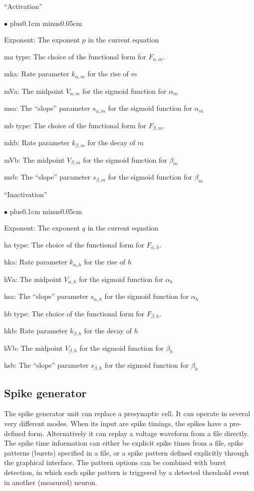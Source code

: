 \documentclass{article}
\newenvironment{myitem}{\begin{list}{$\bullet$}{\setlength{\leftmargin}{1.1em}
\itemsep0.1cm plus0.1cm minus0.05cm
\listparindent0cm
\addtolength{\labelsep}{0.5\labelsep}
\setlength{\labelwidth}{0.8em}
\setlength{\leftmargin}{\labelwidth}
\addtolength{\leftmargin}{\labelsep}
}}{\end{list}}
\begin{document}
\noindent
``Activation''
\begin{myitem}
\item Exponent: The exponent $p$ in the current equation
\item ma type: The choice of the functional form for $F_{\alpha,m}$.
\item mka: Rate parameter $k_{\alpha,m}$ for the rise of $m$
\item mVa: The midpoint $V_{\alpha,m}$ for the sigmoid function
  for $\alpha_m$ 
\item msa: The ``slope'' parameter $s_{\alpha,m}$ for the sigmoid function
  for $\alpha_m$
\item mb type: The choice of the functional form for $F_{\beta,m}$.
\item mkb: Rate parameter $k_{\beta,m}$ for the decay of $m$
\item mVb: The midpoint $V_{\beta,m}$ for the sigmoid function
  for $\beta_m$ 
\item msb: The ``slope'' parameter $s_{\beta,m}$ for the sigmoid function
  for $\beta_m$
\end{myitem}
``Inactivation''
\begin{myitem}
\item Exponent: The exponent $q$ in the current equation
\item ha type: The choice of the functional form for $F_{\alpha,h}$.
\item hka: Rate parameter $k_{\alpha,h}$ for the rise of $h$
\item hVa: The midpoint $V_{\alpha,h}$ for the sigmoid function
  for $\alpha_h$ 
\item hsa: The ``slope'' parameter $s_{\alpha,h}$ for the sigmoid function
  for $\alpha_h$
\item hb type: The choice of the functional form for $F_{\beta,h}$.
\item hkb: Rate parameter $k_{\beta,h}$ for the decay of $h$
\item hVb: The midpoint $V_{\beta,h}$ for the sigmoid function
  for $\beta_h$ 
\item hsb: The ``slope'' parameter $s_{\beta,h}$ for the sigmoid function
  for $\beta_h$
\end{myitem}


\subsection{Spike generator}
The spike generator unit can replace a presynaptic cell. It can
operate in several very different modes. When its input are spike
timings, the spikes have a
pre-defined form. Alternatively it can replay a voltage waveform from
a file directly. The spike time information can either be explicit
spike times from a file, spike patterns (bursts) specified in a file,
or a spike pattern defined explicitly through the graphical interface.
The pattern options can be combined with burst detection, in which
each spike pattern is triggered by a detected thershold event in
another (measured) neuron.
\end{document}
